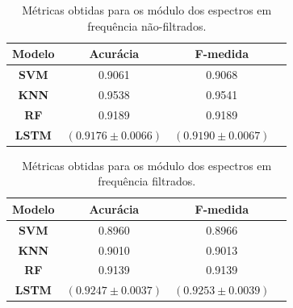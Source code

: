 \documentclass[aspectratio=169]{beamer}
\begin{document}
\begin{frame}
	\begin{minipage}{0.5\textwidth}
	\tiny
	\begin{table}[H]
		\begin{center}
		\caption{Métricas obtidas para os módulo dos espectros em frequência não-filtrados.}
		\begin{tabular}{c c c c}
		\toprule
		\textbf{Modelo} & \textbf{Acurácia} & \textbf{F-medida} \\
		\midrule
		\textbf{SVM} & 0.9061 & 0.9068\\
		\textbf{KNN} & 0.9538 & 0.9541\\
		\textbf{RF} & 0.9189 & 0.9189\\
		\textbf{LSTM} & $(0.9176 \pm 0.0066)$ & $(0.9190 \pm 0.0067)$\\
		\bottomrule
		\end{tabular}
		\end{center}
	\end{table}
	\end{minipage}
	\hfill
	\begin{minipage}{0.5\textwidth}
	\tiny
	\begin{table}[H]
		\begin{center}
		\caption{Métricas obtidas para os módulo dos espectros em frequência filtrados.}
		\begin{tabular}{c c c c}
		\toprule
		\textbf{Modelo} & \textbf{Acurácia} & \textbf{F-medida} \\
		\midrule
		\textbf{SVM} & 0.8960 & 0.8966\\
		\textbf{KNN} & 0.9010 & 0.9013\\
		\textbf{RF} & 0.9139 & 0.9139\\
		\textbf{LSTM} & $(0.9247 \pm 0.0037)$ & $(0.9253 \pm 0.0039)$\\
		\bottomrule
		\end{tabular}
		\end{center}
	\end{table}
	\end{minipage}
	
\end{frame}
\end{document}
